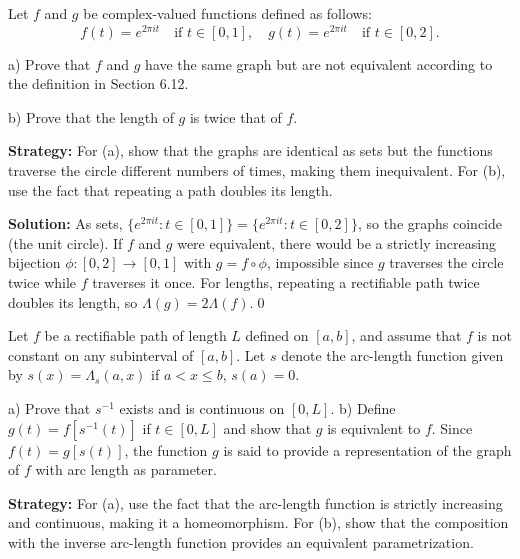 \begin{problembox}
\begin{problemstatement}
Let $f$ and $g$ be complex-valued functions defined as follows:
\[f(t) = e^{2\pi it} \quad \text{if } t \in [0, 1], \quad g(t) = e^{2\pi it} \quad \text{if } t \in [0, 2].\]

a) Prove that $f$ and $g$ have the same graph but are not equivalent according to the definition in Section 6.12.

b) Prove that the length of $g$ is twice that of $f$.
\end{problemstatement}
\end{problembox}

\noindent\textbf{Strategy:} For (a), show that the graphs are identical as sets but the functions traverse the circle different numbers of times, making them inequivalent. For (b), use the fact that repeating a path doubles its length.

\bigskip\noindent\textbf{Solution:}
As sets, $\{e^{2\pi it}:t\in[0,1]\}=\{e^{2\pi it}:t\in[0,2]\}$, so the graphs coincide (the unit circle). If $f$ and $g$ were equivalent, there would be a strictly increasing bijection $\phi:[0,2]\to[0,1]$ with $g=f\circ\phi$, impossible since $g$ traverses the circle twice while $f$ traverses it once. For lengths, repeating a rectifiable path twice doubles its length, so $\Lambda(g)=2\Lambda(f)$.\qed


\begin{problembox}
\begin{problemstatement}
Let $f$ be a rectifiable path of length $L$ defined on $[a, b]$, and assume that $f$ is not constant on any subinterval of $[a, b]$. Let $s$ denote the arc-length function given by $s(x) = \Lambda_s(a, x)$ if $a < x \leq b$, $s(a) = 0$.

a) Prove that $s^{-1}$ exists and is continuous on $[0, L]$.
b) Define $g(t) = f[s^{-1}(t)]$ if $t \in [0, L]$ and show that $g$ is equivalent to $f$. Since $f(t) = g[s(t)]$, the function $g$ is said to provide a representation of the graph of $f$ with arc length as parameter.
\end{problemstatement}
\end{problembox}

\noindent\textbf{Strategy:} For (a), use the fact that the arc-length function is strictly increasing and continuous, making it a homeomorphism. For (b), show that the composition with the inverse arc-length function provides an equivalent parametrization.

